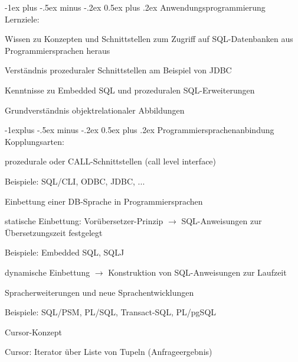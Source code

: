 \documentclass[a4paper]{article}
\makeatletter
\renewcommand{\section}{\@startsection{section}{1}{0mm}%
                                {-1ex plus -.5ex minus -.2ex}%
                                {0.5ex plus .2ex}%
                                {\normalfont\large\bfseries}}
\renewcommand{\subsection}{\@startsection{subsection}{2}{0mm}%
                                {-1explus -.5ex minus -.2ex}%
                                {0.5ex plus .2ex}%
                                {\normalfont\normalsize\bfseries}}
\makeatother
\begin{document}
\begin{multicols}{3}
    \section{Anwendungsprogrammierung}
    Lernziele:
    \begin{itemize*}
        \item Wissen zu Konzepten und Schnittstellen zum Zugriff auf SQL-Datenbanken aus Programmiersprachen heraus
        \item Verständnis prozeduraler Schnittstellen am Beispiel von JDBC
        \item Kenntnisse zu Embedded SQL und prozeduralen SQL-Erweiterungen
        \item Grundverständnis objektrelationaler Abbildungen
    \end{itemize*}

    \subsection{Programmiersprachenanbindung}
    Kopplungsarten:
    \begin{itemize*}
        \item prozedurale oder CALL-Schnittstellen (call level interface)
        \begin{itemize*}
            \item Beispiele: SQL/CLI, ODBC, JDBC, ...
        \end{itemize*}
        \item Einbettung einer DB-Sprache in Programmiersprachen
        \begin{itemize*}
            \item statische Einbettung: Vorübersetzer-Prinzip $\rightarrow$ SQL-Anweisungen zur Übersetzungszeit festgelegt
            \item Beispiele: Embedded SQL, SQLJ
            \item dynamische Einbettung $\rightarrow$ Konstruktion von SQL-Anweisungen zur Laufzeit
        \end{itemize*}
        \item Spracherweiterungen und neue Sprachentwicklungen
        \begin{itemize*}
            \item Beispiele: SQL/PSM, PL/SQL, Transact-SQL, PL/pgSQL
        \end{itemize*}
        \item Cursor-Konzept
        \begin{itemize*}
            \item Cursor: Iterator über Liste von Tupeln (Anfrageergebnis)
        \end{itemize*}
    \end{itemize*}


\end{multicols}
\end{document}
